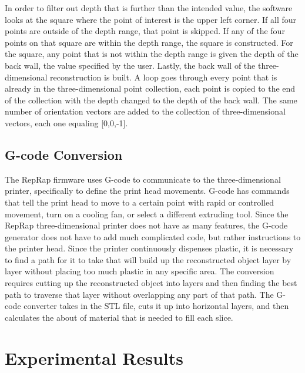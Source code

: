 \documentclass[pdftex,10.5pt]{report}
\begin{document}
In order to filter out depth that is further than the intended value, the software looks at the square where the point of interest is the upper left corner.  If all four points are outside of the depth range, that point is skipped. If any of the four points on that square are within the depth range, the square is constructed. For the square, any point that is not within the depth range is given the depth of the back wall, the value specified by the user. Lastly, the back wall of the three-dimensional reconstruction is built. A loop goes through every point that is already in the three-dimensional point collection, each point is copied to the end of the collection with the depth changed to the depth of the back wall. The same number of orientation vectors are added to the collection of three-dimensional vectors, each one equaling [0,0,-1]. 
\cite{cite8}

\subsection{G-code Conversion}
The RepRap firmware uses G-code to communicate to the three-dimensional printer, specifically to define the print head movements. G-code has commands that tell the print head to move to a certain point with rapid or controlled movement, turn on a cooling fan, or select a different extruding tool. Since the RepRap three-dimensional printer does not have as many features, the G-code generator does not have to add much complicated code, but rather instructions to the printer head. Since the printer continuously dispenses plastic, it is necessary to find a path for it to take that will build up the reconstructed object layer by layer without placing too much plastic in any specific area. The conversion requires cutting up the reconstructed object into layers and then finding the best path to traverse that layer without overlapping any part of that path. The G-code converter takes in the STL file, cuts it up into horizontal layers, and then calculates the about of material that is needed to fill each slice. 

\section{Experimental Results}
\end{document}
